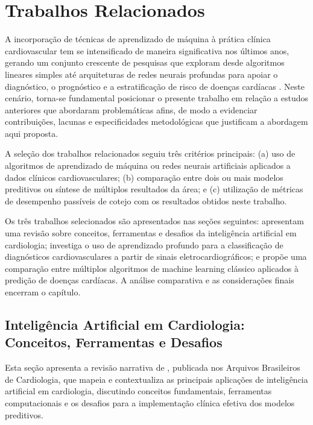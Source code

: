 \chapter{Trabalhos Relacionados}
\label{cap:trabalhos}

A incorpora\c c\~ao de t\'ecnicas de aprendizado de m\'aquina \`a pr\'atica cl\'inica cardiovascular tem se intensificado de maneira significativa nos \'ultimos anos, gerando um conjunto crescente de pesquisas que exploram desde algoritmos lineares simples at\'e arquiteturas de redes neurais profundas para apoiar o diagn\'ostico, o progn\'ostico e a estratifica\c c\~ao de risco de doen\c cas card\'iacas \cite{mesquita2020}. Neste cen\'ario, torna-se fundamental posicionar o presente trabalho em rela\c c\~ao a estudos anteriores que abordaram problem\'aticas afins, de modo a evidenciar contribui\c c\~oes, lacunas e especificidades metodol\'ogicas que justificam a abordagem aqui proposta.

A sele\c c\~ao dos trabalhos relacionados seguiu tr\^es crit\'erios principais: (a) uso de algoritmos de aprendizado de m\'aquina ou redes neurais artificiais aplicados a dados cl\'inicos cardiovasculares; (b) compara\c c\~ao entre dois ou mais modelos preditivos ou s\'intese de m\'ultiplos resultados da \'area; e (c) utiliza\c c\~ao de m\'etricas de desempenho pass\'iveis de cotejo com os resultados obtidos neste trabalho.

Os tr\^es trabalhos selecionados s\~ao apresentados nas se\c c\~oes seguintes:  apresentam uma revis\~ao sobre conceitos, ferramentas e desafios da intelig\^encia artificial em cardiologia;  investiga o uso de aprendizado profundo para a classifica\c c\~ao de diagn\'osticos cardiovasculares a partir de sinais eletrocardiogr\'aficos; e  prop\~oe uma compara\c c\~ao entre m\'ultiplos algoritmos de machine learning cl\'assico aplicados \`a predi\c c\~ao de doen\c cas card\'iacas. A an\'alise comparativa e as considera\c c\~oes finais encerram o cap\'itulo.

\section{Intelig\^encia Artificial em Cardiologia: Conceitos, Ferramentas e Desafios}

Esta se\c c\~ao apresenta a revis\~ao narrativa de , publicada nos Arquivos Brasileiros de Cardiologia, que mapeia e contextualiza as principais aplica\c c\~oes de intelig\^encia artificial em cardiologia, discutindo conceitos fundamentais, ferramentas computacionais e os desafios para a implementa\c c\~ao cl\'inica efetiva dos modelos preditivos.


